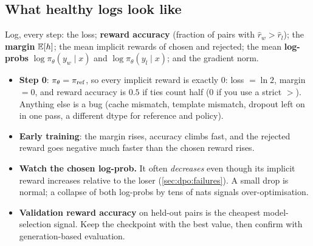 \subsection{What healthy logs look like}

Log, every step: the loss; \textbf{reward accuracy} (fraction of pairs with $\hat r_w>\hat r_l$); the
\textbf{margin} $\mathbb{E}[h]$; the mean implicit rewards of chosen and rejected; the mean
\textbf{log-probs} $\log\pi_\theta(y_w\mid x)$ and $\log\pi_\theta(y_l\mid x)$; and the gradient norm.
\begin{itemize}
\item \textbf{Step 0}: $\pi_\theta=\pi_{\text{ref}}$, so every implicit reward is exactly 0: loss $=\ln 2$,
  margin $=0$, and reward accuracy is $0.5$ if ties count half (0 if you use a strict $>$). Anything
  else is a bug (cache mismatch, template mismatch, dropout left on in one pass, a different dtype for
  reference and policy).
\item \textbf{Early training}: the margin rises, accuracy climbs fast, and the rejected reward goes
  negative much faster than the chosen reward rises.
\item \textbf{Watch the chosen log-prob.} It often \emph{decreases} even though its implicit reward
  increases relative to the loser (\cref{sec:dpo:failures}). A small drop is normal; a collapse
  of both log-probs by tens of nats signals over-optimisation.
\item \textbf{Validation reward accuracy} on held-out pairs is the cheapest model-selection signal.
  Keep the checkpoint with the best value, then confirm with generation-based evaluation.
\end{itemize}

